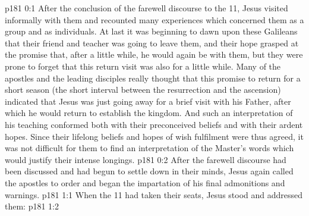\author{Midwayer Commission}
\vs p181 0:1 After the conclusion of the farewell discourse to the 11, Jesus visited informally with them and recounted many experiences which concerned them as a group and as individuals. At last it was beginning to dawn upon these Galileans that their friend and teacher was going to leave them, and their hope grasped at the promise that, after a little while, he would again be with them, but they were prone to forget that this return visit was also for a little while. Many of the apostles and the leading disciples really thought that this promise to return for a short season (the short interval between the resurrection and the ascension) indicated that Jesus was just going away for a brief visit with his Father, after which he would return to establish the kingdom. And such an interpretation of his teaching conformed both with their preconceived beliefs and with their ardent hopes. Since their lifelong beliefs and hopes of wish fulfilment were thus agreed, it was not difficult for them to find an interpretation of the Master’s words which would justify their intense longings.
\vs p181 0:2 After the farewell discourse had been discussed and had begun to settle down in their minds, Jesus again called the apostles to order and began the impartation of his final admonitions and warnings.
\vs p181 1:1 When the 11 had taken their seats, Jesus stood and addressed them: 
\vs p181 1:2 
